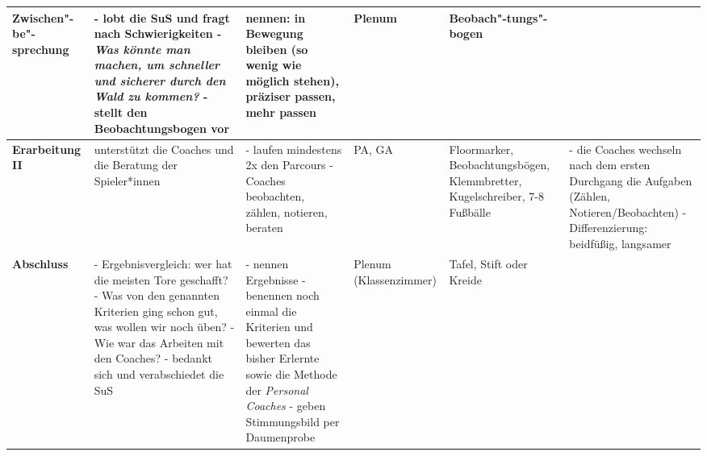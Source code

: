 \begin{landscape}
\begin{longtable}{p{2cm}|p{5.5cm}|p{5.5cm}|p{2cm}|p{2cm}|p{4cm}}
\\
\hline
\textbf{Zwischen"-be"-sprechung}
&
- lobt die SuS und fragt nach Schwierigkeiten \newline
- \emph{Was könnte man machen, um schneller und sicherer durch den Wald zu kommen?} \newline
-  stellt den Beobachtungsbogen vor \newline
&
nennen: in Bewegung bleiben (so wenig wie möglich stehen), präziser passen, mehr passen
&
Plenum
&
Beobach"-tungs"-bogen
&
\\
\hline
\textbf{Erarbeitung II} \newline
&
unterstützt die Coaches und die Beratung der Spieler*innen
&
- laufen mindestens 2x den Parcours  \newline
- Coaches beobachten, zählen, notieren, beraten
&
PA, GA
&
Floormarker, Beobachtungsbögen, Klemmbretter, Kugelschreiber, 7-8 Fußbälle
&
- die Coaches wechseln nach dem ersten Durchgang die Aufgaben (Zählen, Notieren/Beobachten) \newline
- Differenzierung: beidfüßig, langsamer

\\
\hline
\textbf{Abschluss}
&
- Ergebnisvergleich: wer hat die meisten Tore geschafft? \newline
- Was von den genannten Kriterien ging schon gut, was wollen wir noch üben? \newline
- Wie war das Arbeiten mit den Coaches? \newline
- bedankt sich und verabschiedet die SuS
&
- nennen Ergebnisse \newline
- benennen noch einmal die Kriterien und bewerten das bisher Erlernte sowie die Methode der \emph{Personal Coaches} \newline
- geben Stimmungsbild per Daumenprobe
&
Plenum (Klassenzimmer)
&
Tafel, Stift oder Kreide
&

\end{longtable}
\end{landscape}

\normalsize
